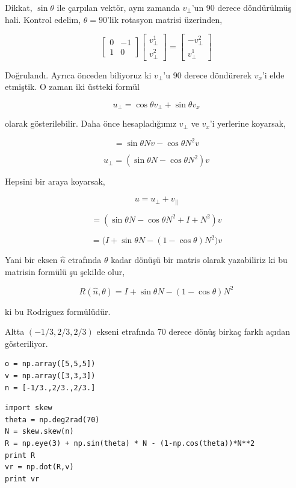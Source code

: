 \documentclass[12pt,fleqn]{article}\usepackage{../../common}
\begin{document}
Dikkat, $\sin \theta$ ile çarpılan vektör, aynı zamanda $v_\perp$'un 90 derece
döndürülmüş hali. Kontrol edelim, $\theta = 90$'lik rotasyon matrisi 
üzerinden,

$$ 
\left[\begin{array}{rrr}
0 & -1 \\ 1 & 0
\end{array}\right]
\left[\begin{array}{rrr}
v_\perp^1 \\
v_\perp^2
\end{array}\right] = 
\left[\begin{array}{rrr}
-v_\perp^2 \\
v_\perp^1
\end{array}\right]
$$

Doğrulandı. Ayrıca önceden biliyoruz ki $v_\perp$'u 90 derece döndürerek $v_x$'i elde
etmiştik. O zaman iki üstteki formül

$$ u_\perp = \cos \theta v_\perp + \sin \theta v_x $$

olarak gösterilebilir. Daha önce hesapladığımız $v_\perp$ ve $v_x$'i
yerlerine koyarsak, 

$$ = \sin \theta Nv - \cos \theta N^2 v $$

$$ u_\perp = (\sin \theta N - \cos \theta N^2) v $$

Hepsini bir araya koyarsak, 

$$ u = u_\perp + v_\parallel $$

$$ = ( \sin \theta N - \cos \theta N^2 + I + N^2)v  $$

$$ = \big( I + \sin \theta N - (1-\cos \theta) N^2 \big) v  $$

Yani bir eksen $\hat{n}$ etrafında $\theta$ kadar dönüşü bir matris olarak
yazabiliriz ki bu matrisin formülü şu şekilde olur, 

$$ R(\hat{n},\theta) =  I + \sin \theta N - (1-\cos \theta) N^2 $$

ki bu Rodriguez formülüdür. 

Altta $(-1/3,2/3,2/3)$ ekseni etrafında 70 derece dönüş birkaç farklı
açıdan gösteriliyor. 

\begin{verbatim}
o = np.array([5,5,5])
v = np.array([3,3,3])
n = [-1/3.,2/3.,2/3.]
\end{verbatim}

\begin{verbatim}
import skew
theta = np.deg2rad(70)
N = skew.skew(n)
R = np.eye(3) + np.sin(theta) * N - (1-np.cos(theta))*N**2
print R
vr = np.dot(R,v)
print vr
\end{verbatim}
\end{document}
